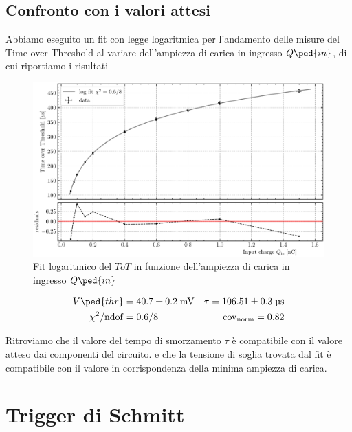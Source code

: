 \documentclass[10pt,a4paper]{article}
\begin{document}
\subsection{Confronto con i valori attesi}
Abbiamo eseguito un fit con legge logaritmica per l'andamento delle misure
del Time-over-Threshold al variare dell'ampiezza di carica in ingresso
$Q\ped{in}$, di cui riportiamo i risultati
\begin{figure}[htbp]
    \centering
	\includegraphics[scale=0.7]{logfit}
    \caption{Fit logaritmico del $ToT$ in funzione dell'ampiezza di carica in
    ingresso $Q\ped{in}$ \label{fig: logfit}}
\end{figure}
\begin{align*}
V\ped{thr} &= 40.7 \pm 0.2 \; \si{m\V}
&\tau = 106.51 \pm 0.3 \; \si{\micro\s} \\
\chi^2/\mathrm{ndof} &= 0.6/8 &\mathrm{cov_{norm}} = 0.82
\end{align*}

Ritroviamo che il valore del tempo di smorzamento $\tau$ è compatibile con il
valore atteso dai componenti del circuito.
e che la tensione di soglia trovata dal fit è compatibile con il valore
in corrispondenza della minima ampiezza di carica.
\section{Trigger di Schmitt}
\end{document}
